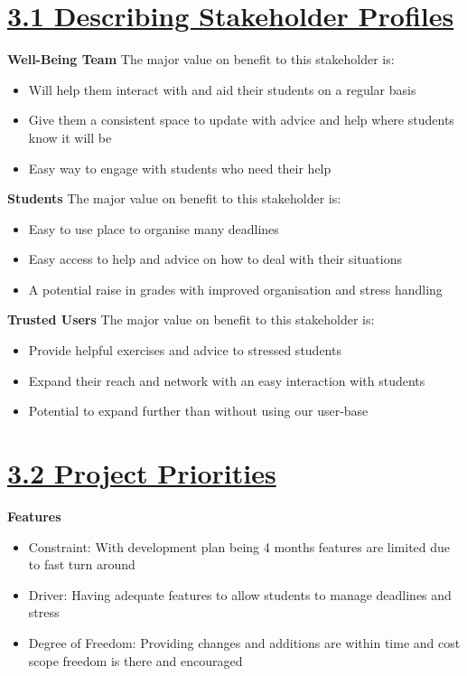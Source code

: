 \documentclass[a4paper]{article}
\begin{document}
\pagebreak
\section*{\underline{3.1 Describing Stakeholder Profiles}}
\textbf{Well-Being Team}
The major value on benefit to this stakeholder is:
\begin{itemize}
	\item Will help them interact with and aid their students on a regular basis
	\item Give them a consistent space to update with advice and help where students know it will be
	\item Easy way to engage with students who need their help
\end{itemize}

\noindent\textbf{Students}
The major value on benefit to this stakeholder is:
\begin{itemize}
	\item Easy to use place to organise many deadlines
	\item Easy access to help and advice on how to deal with their situations
	\item A potential raise in grades with improved organisation and stress handling
\end{itemize}

\noindent\textbf{Trusted Users}
The major value on benefit to this stakeholder is:
\begin{itemize}
	\item Provide helpful exercises and advice to stressed students
	\item Expand their reach and network with an easy interaction with students
	\item Potential to expand further than without using our user-base 
\end{itemize}

\section*{\underline{3.2 Project Priorities}}
\textbf{Features}
\begin{itemize}
	\item Constraint: With development plan being 4 months features are limited due to fast turn around
	\item Driver: Having adequate features to allow students to manage deadlines and stress
	\item Degree of Freedom: Providing changes and additions are within time and cost scope freedom is there and encouraged
\end{itemize}
\end{document}
